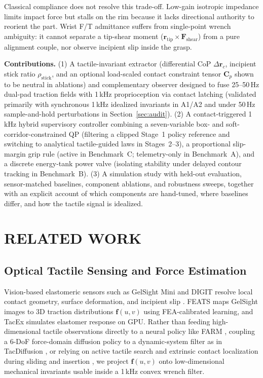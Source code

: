 \documentclass[letterpaper,10pt,conference]{IEEEtran}
\begin{document}
Classical compliance does not resolve this trade-off. Low-gain isotropic impedance limits impact force but stalls on the rim because it lacks directional authority to reorient the part. Wrist F/T admittance suffers from single-point wrench ambiguity: it cannot separate a tip-shear moment ($\mathbf{r}_{\mathrm{tip}}\times\mathbf{F}_{\mathrm{shear}}$) from a pure alignment couple, nor observe incipient slip inside the grasp.

\textbf{Contributions.} (1) A tactile-invariant extractor (differential CoP $\Delta\mathbf{r}_c$, incipient stick ratio $\rho_{\mathrm{stick}}$, and an optional load-scaled contact constraint tensor $\mathbf{C}_p$ shown to be neutral in ablations) and complementary observer designed to fuse 25--50\,Hz dual-pad traction fields with 1\,kHz proprioception via contact latching (validated primarily with synchronous 1\,kHz idealized invariants in A1/A2 and under 50\,Hz sample-and-hold perturbations in Section~\ref{sec:audit}). (2) A contact-triggered 1\,kHz hybrid supervisory controller combining a seven-variable box- and soft-corridor-constrained QP (filtering a clipped Stage~1 policy reference and switching to analytical tactile-guided laws in Stages~2--3), a proportional slip-margin grip rule (active in Benchmark~C; telemetry-only in Benchmark~A), and a discrete energy-tank power valve (isolating stability under delayed contour tracking in Benchmark~B). (3) A simulation study with held-out evaluation, sensor-matched baselines, component ablations, and robustness sweeps, together with an explicit account of which components are hand-tuned, where baselines differ, and how the tactile signal is idealized.

\section{RELATED WORK}

\subsection{Optical Tactile Sensing and Force Estimation}
Vision-based elastomeric sensors such as GelSight Mini and DIGIT resolve local contact geometry, surface deformation, and incipient slip \cite{yuangelsight,lambetadigit,dongslip}. FEATS \cite{helmut2024feats} maps GelSight images to 3D traction distributions $\mathbf{f}(u,v)$ using FEA-calibrated learning, and TacEx \cite{nguyen2024tacex} simulates elastomer response on GPU. Rather than feeding high-dimensional tactile observations directly to a neural policy like FARM \cite{helmut2025farm}, coupling a 6-DoF force-domain diffusion policy to a dynamic-system filter as in TacDiffusion \cite{wu2025tacdiffusion}, or relying on active tactile search and extrinsic contact localization during sliding and insertion \cite{kimactive,kimextrinsic,shecable}, we project $\mathbf{f}(u,v)$ onto low-dimensional mechanical invariants usable inside a 1\,kHz convex wrench filter.
\end{document}
